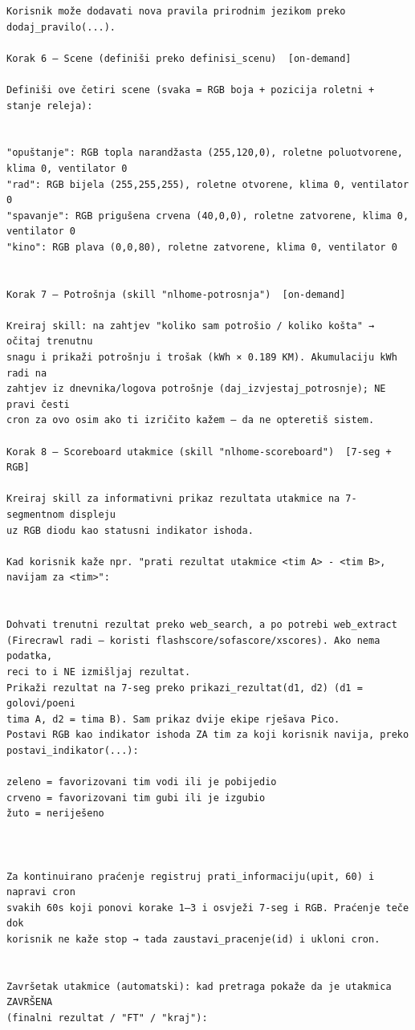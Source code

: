 \documentclass[11pt,a4paper]{article}
\begin{document}
\begin{lstlisting}[style=plain,caption={Inicijalni (konfiguracijski) prompt NLHome agenta},captionpos=b]
Korisnik može dodavati nova pravila prirodnim jezikom preko dodaj_pravilo(...).

Korak 6 — Scene (definiši preko definisi_scenu)  [on-demand]

Definiši ove četiri scene (svaka = RGB boja + pozicija roletni + stanje releja):


"opuštanje": RGB topla narandžasta (255,120,0), roletne poluotvorene, klima 0, ventilator 0
"rad": RGB bijela (255,255,255), roletne otvorene, klima 0, ventilator 0
"spavanje": RGB prigušena crvena (40,0,0), roletne zatvorene, klima 0, ventilator 0
"kino": RGB plava (0,0,80), roletne zatvorene, klima 0, ventilator 0


Korak 7 — Potrošnja (skill "nlhome-potrosnja")  [on-demand]

Kreiraj skill: na zahtjev "koliko sam potrošio / koliko košta" → očitaj trenutnu
snagu i prikaži potrošnju i trošak (kWh × 0.189 KM). Akumulaciju kWh radi na
zahtjev iz dnevnika/logova potrošnje (daj_izvjestaj_potrosnje); NE pravi česti
cron za ovo osim ako ti izričito kažem — da ne opteretiš sistem.

Korak 8 — Scoreboard utakmice (skill "nlhome-scoreboard")  [7-seg + RGB]

Kreiraj skill za informativni prikaz rezultata utakmice na 7-segmentnom displeju
uz RGB diodu kao statusni indikator ishoda.

Kad korisnik kaže npr. "prati rezultat utakmice <tim A> - <tim B>, navijam za <tim>":


Dohvati trenutni rezultat preko web_search, a po potrebi web_extract
(Firecrawl radi — koristi flashscore/sofascore/xscores). Ako nema podatka,
reci to i NE izmišljaj rezultat.
Prikaži rezultat na 7-seg preko prikazi_rezultat(d1, d2) (d1 = golovi/poeni
tima A, d2 = tima B). Sam prikaz dvije ekipe rješava Pico.
Postavi RGB kao indikator ishoda ZA tim za koji korisnik navija, preko
postavi_indikator(...):

zeleno = favorizovani tim vodi ili je pobijedio
crveno = favorizovani tim gubi ili je izgubio
žuto = neriješeno



Za kontinuirano praćenje registruj prati_informaciju(upit, 60) i napravi cron
svakih 60s koji ponovi korake 1–3 i osvježi 7-seg i RGB. Praćenje teče dok
korisnik ne kaže stop → tada zaustavi_pracenje(id) i ukloni cron.


Završetak utakmice (automatski): kad pretraga pokaže da je utakmica ZAVRŠENA
(finalni rezultat / "FT" / "kraj"):



\end{lstlisting}
\end{document}
